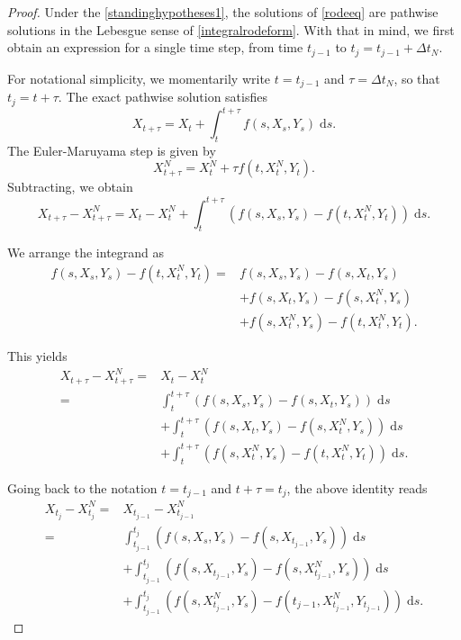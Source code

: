 \documentclass[reqno,12pt]{amsart}
\theoremstyle{plain}%
\theoremstyle{definition}
\begin{document}
\begin{proof}
    Under the \cref{standinghypotheses1}, the solutions of \eqref{rodeeq} are pathwise solutions in the Lebesgue sense of \eqref{integralrodeform}. With that in mind, we first obtain an expression for a single time step, from time $t_{j-1}$ to $t_j = t_{j-1} + \Delta t_N$.
    
    For notational simplicity, we momentarily write $t = t_{j-1}$ and $\tau = \Delta t_N$, so that $t_j = t + \tau$. The exact pathwise solution satisfies
    $$
    X_{t + \tau} = X_t + \int_t^{t + \tau} f(s, X_s, Y_s) \;\mathrm{d}s.
    $$
    The Euler-Maruyama step is given by
    $$
    X_{t+\tau}^N = X_t^N + \tau f(t, X_t^N, Y_t).
    $$
    Subtracting, we obtain
    $$
    X_{t + \tau} - X_{t + \tau}^N = X_t - X_t^N + \int_t^{t + \tau} \left( f(s, X_s, Y_s) - f(t, X_t^N, Y_t) \right)\;\mathrm{d}s.
    $$

    We arrange the integrand as
    \begin{align*}
    f(s, X_s, Y_s) - f(t, X_t^N, Y_t) = & f(s, X_s, Y_s) - f(s, X_t, Y_s) \\ 
    & + f(s, X_t, Y_s) - f(s, X_t^N, Y_s) \\
    & + f(s, X_t^N, Y_s) - f(t, X_t^N, Y_t).
    \end{align*}

    This yields
    \begin{align*}
        X_{t + \tau} - X_{t + \tau}^N  = & X_t - X_t^N \\
        = &  \int_t^{t + \tau} \left( f(s, X_s, Y_s) - f(s, X_t, Y_s) \right)\;\mathrm{d}s \\ 
        & + \int_t^{t + \tau} \left( f(s, X_t, Y_s) - f(s, X_t^N, Y_s) \right)\;\mathrm{d}s \\
        & + \int_t^{t + \tau} \left( f(s, X_t^N, Y_s) - f(t, X_t^N, Y_t) \right)\;\mathrm{d}s.
    \end{align*}

    Going back to the notation $t = t_{j-1}$ and $t + \tau = t_j$, the above identity reads
    \begin{equation}
        \label{singlestep}
        \begin{aligned}
            X_{t_j} - X_{t_j}^N  = & X_{t_{j-1}} - X_{t_{j-1}}^N \\
            = &  \int_{t_{j-1}}^{t_j} \left( f(s, X_s, Y_s) - f(s, X_{t_{j-1}}, Y_s) \right)\;\mathrm{d}s \\ 
            & + \int_{t_{j-1}}^{t_j} \left( f(s, X_{t_{j-1}}, Y_s) - f(s, X_{t_{j-1}}^N, Y_s) \right)\;\mathrm{d}s \\
            & + \int_{t_{j-1}}^{t_j} \left( f(s, X_{t_{j-1}}^N, Y_s) - f(t_{j-1}, X_{t_{j-1}}^N, Y_{t_{j-1}}) \right)\;\mathrm{d}s.
        \end{aligned}
    \end{equation}


\end{proof}
\end{document}
